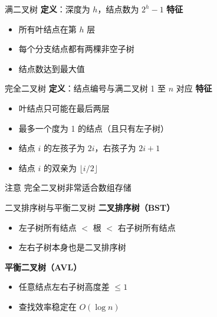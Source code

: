 \documentclass[10pt, aspectratio=169]{beamer}
\begin{document}
\begin{frame}{满二叉树}
    \textbf{定义}：深度为 $h$，结点数为 $2^h - 1$
    \vspace{0.5em}
    \textbf{特征}
    \begin{itemize}
        \item 所有叶结点在第 $h$ 层
        \item 每个分支结点都有两棵非空子树
        \item 结点数达到最大值
    \end{itemize}
\end{frame}

\begin{frame}{完全二叉树}
    \textbf{定义}：结点编号与满二叉树 1 至 $n$ 对应
    \vspace{0.5em}
    \textbf{特征}
    \begin{itemize}
        \item 叶结点只可能在最后两层
        \item 最多一个度为 1 的结点（且只有左子树）
        \item 结点 $i$ 的左孩子为 $2i$，右孩子为 $2i+1$
        \item 结点 $i$ 的双亲为 $\lfloor i/2 \rfloor$
    \end{itemize}
    \vspace{0.5em}
    \begin{block}{注意}
        完全二叉树非常适合数组存储
    \end{block}
\end{frame}

\begin{frame}{二叉排序树与平衡二叉树}
    \textbf{二叉排序树（BST）}
    \begin{itemize}
        \item 左子树所有结点 $<$ 根 $<$ 右子树所有结点
        \item 左右子树本身也是二叉排序树
    \end{itemize}
    \vspace{0.3em}
    \textbf{平衡二叉树（AVL）}
    \begin{itemize}
        \item 任意结点左右子树高度差 $\le 1$
        \item 查找效率稳定在 $O(\log n)$
    \end{itemize}
\end{frame}
\end{document}
